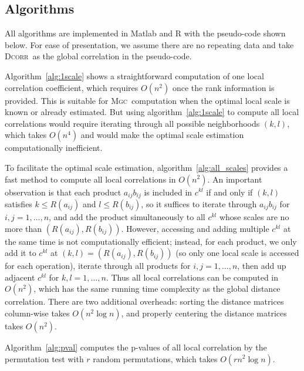 \documentclass[11pt]{article}
\providecommand{\sct}[1]{{\normalfont\textsc{#1}}}
\newcommand{\G}{c}
\newcommand{\Mgc}{\sct{Mgc}}
\newcommand{\Dcorr}{\sct{Dcorr}}
\begin{document}
\subsection{Algorithms}
\label{appen:algorithms}
All algorithms are implemented in Matlab and R with the pseudo-code shown below. For ease of presentation, we assume there are no repeating data and take \Dcorr~as the global correlation in the pseudo-code.

Algorithm~\ref{alg:1scale} shows a straightforward computation of one local correlation coefficient, which requires $O(n^2)$ once the rank information is provided. This is suitable for \Mgc~computation when the optimal local scale is known or already estimated. But using algorithm~\ref{alg:1scale} to compute all local correlations would require iterating through all possible neighborhoods $(k,l)$, which takes $O(n^4)$ and would make the optimal scale estimation computationally inefficient.

To facilitate the optimal scale estimation, algorithm~\ref{alg:all_scales} provides a fast method to compute all local correlations in $O(n^2)$. An important observation is that each product $a_{ij}b_{ij}$ is included in $\G^{kl}$ if and only if $(k,l)$ satisfies $k\leq R(a_{ij})$ and $l\leq R(b_{ij})$, so it suffices to iterate through $a_{ij}b_{ij}$ for $i,j=1,\ldots,n$, and add the product simultaneously to all $\G^{kl}$
whose scales are no more than $(R(a_{ij}),R(b_{ij}))$. However, accessing and adding multiple $\G^{kl}$ at the same time is not computationally efficient; instead, for each product, we only add it to $\G^{kl}$ at $(k,l)=(R(a_{ij}),R(b_{ij}))$ (so only one local scale is accessed for each operation), iterate through all products for $i,j=1,\ldots,n$, then add up adjacent $\G^{kl}$ for $k,l=1,\ldots,n$. Thus all local correlations can be computed in $O(n^2)$, which has the same running time complexity as the global distance correlation. There are two additional overheads: sorting the distance matrices column-wise takes $O(n^2 \log n)$, and properly centering the distance matrices takes $O(n^2)$.

Algorithm~\ref{alg:pval} computes the p-values of all local correlation by the permutation test with $r$ random permutations, which takes $O(rn^2 \log n)$.
\end{document}
